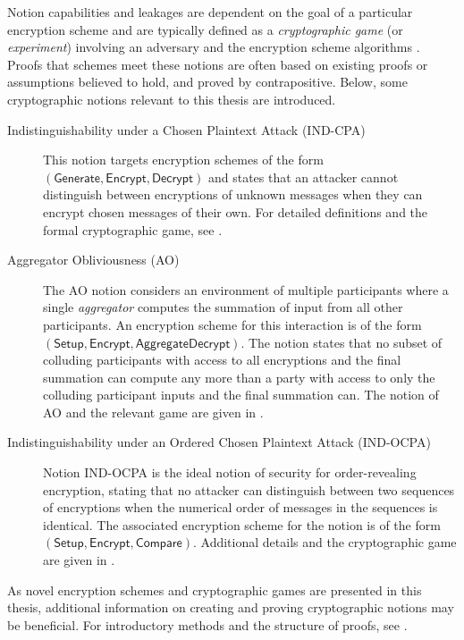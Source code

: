 Notion capabilities and leakages are dependent on the goal of a particular encryption scheme and are typically defined as a \textit{cryptographic game} (or \textit{experiment}) involving an adversary and the encryption scheme algorithms \cite{katzIntroductionModernCryptography2008,hwangModernCryptographyProof2021,bellareRandomOraclesAre1993a}. Proofs that schemes meet these notions are often based on existing proofs or assumptions believed to hold, and proved by contrapositive. Below, some cryptographic notions relevant to this thesis are introduced.
\begin{description}
    \item[Indistinguishability under a Chosen Plaintext Attack (IND-CPA)] This notion targets encryption schemes of the form $(\mathsf{Generate},\mathsf{Encrypt},\mathsf{Decrypt})$ and states that an attacker cannot distinguish between encryptions of unknown messages when they can encrypt chosen messages of their own. For detailed definitions and the formal cryptographic game, see \cite{katzIntroductionModernCryptography2008}.
    \item[Aggregator Obliviousness (AO)] The AO notion considers an environment of multiple participants where a single \textit{aggregator} computes the summation of input from all other participants. An encryption scheme for this interaction is of the form $(\mathsf{Setup},\mathsf{Encrypt},\mathsf{AggregateDecrypt})$. The notion states that no subset of colluding participants with access to all encryptions and the final summation can compute any more than a party with access to only the colluding participant inputs and the final summation can. The notion of AO and the relevant game are given in \cite{shiPrivacyPreservingAggregationTimeSeries2011}.
    \item[Indistinguishability under an Ordered Chosen Plaintext Attack (IND-OCPA)] \hspace{-0.7782pt}Notion IND-OCPA is the ideal notion of security for order-revealing encryption, stating that no attacker can distinguish between two sequences of encryptions when the numerical order of messages in the sequences is identical. The associated encryption scheme for the notion is of the form $(\mathsf{Setup},\mathsf{Encrypt},\mathsf{Compare})$. Additional details and the cryptographic game are given in \cite{boldyrevaOrderPreservingSymmetricEncryption2009}.
\end{description}
As novel encryption schemes and cryptographic games are presented in this thesis, additional information on creating and proving cryptographic notions may be beneficial. For introductory methods and the structure of proofs, see \cite{katzIntroductionModernCryptography2008,hwangModernCryptographyProof2021}.

